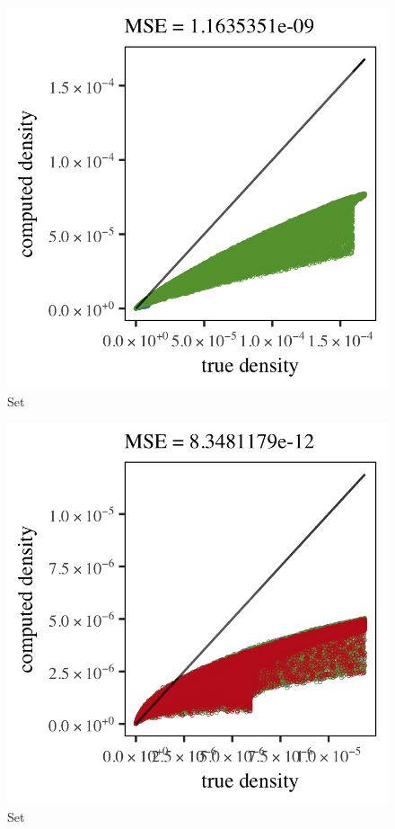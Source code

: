 \begin{subfigure}{0.3\textwidth}
	\centering
	\includegraphics[keepaspectratio=true, width=\textwidth, height=0.23\textheight]{4/img/results_ferdosi_4_600000_parzen}
	\caption{Set \ferdosiFour}
	\label{fig:4:simulated:datasets:parzen:ferdosi4}
\end{subfigure}
\begin{subfigure}{0.3\textwidth}
	\centering
	\includegraphics[keepaspectratio=true, width=\textwidth, height=0.23\textheight]{4/img/results_ferdosi_5_600000_parzen}
	\caption{Set \ferdosiFive}
	\label{fig:4:simulated:datasets:parzen:ferdosi5}
\end{subfigure}	